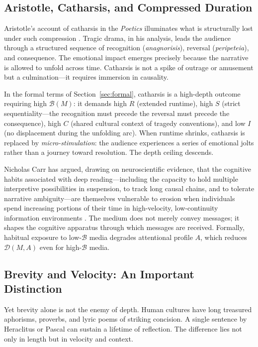 \documentclass[12pt]{article}
\theoremstyle{definition}
\theoremstyle{plain}
\begin{document}
\subsection{Aristotle, Catharsis, and Compressed Duration}

Aristotle's account of catharsis in the \emph{Poetics} illuminates what is structurally lost under such compression \citep{Aristotle1996}. Tragic drama, in his analysis, leads the audience through a structured sequence of recognition (\emph{anagnorisis}), reversal (\emph{peripeteia}), and consequence. The emotional impact emerges precisely because the narrative is allowed to unfold across time. Catharsis is not a spike of outrage or amusement but a culmination---it requires immersion in causality.

In the formal terms of Section~\ref{sec:formal}, catharsis is a high-depth outcome requiring high $\mathcal{B}(M)$: it demands high $R$ (extended runtime), high $S$ (strict sequentiality---the recognition must precede the reversal must precede the consequence), high $C$ (shared cultural context of tragedy conventions), and low $I$ (no displacement during the unfolding arc). When runtime shrinks, catharsis is replaced by \emph{micro-stimulation}: the audience experiences a series of emotional jolts rather than a journey toward resolution. The depth ceiling descends.

Nicholas Carr has argued, drawing on neuroscientific evidence, that the cognitive habits associated with deep reading---including the capacity to hold multiple interpretive possibilities in suspension, to track long causal chains, and to tolerate narrative ambiguity---are themselves vulnerable to erosion when individuals spend increasing portions of their time in high-velocity, low-continuity information environments \citep{Carr2010}. The medium does not merely convey messages; it shapes the cognitive apparatus through which messages are received. Formally, habitual exposure to low-$\mathcal{B}$ media degrades attentional profile $A$, which reduces $\mathcal{D}(M, A)$ even for high-$\mathcal{B}$ media.

\subsection{Brevity and Velocity: An Important Distinction}

Yet brevity alone is not the enemy of depth. Human cultures have long treasured aphorisms, proverbs, and lyric poems of striking concision. A single sentence by Heraclitus or Pascal can sustain a lifetime of reflection. The difference lies not only in length but in velocity and context.
\end{document}
